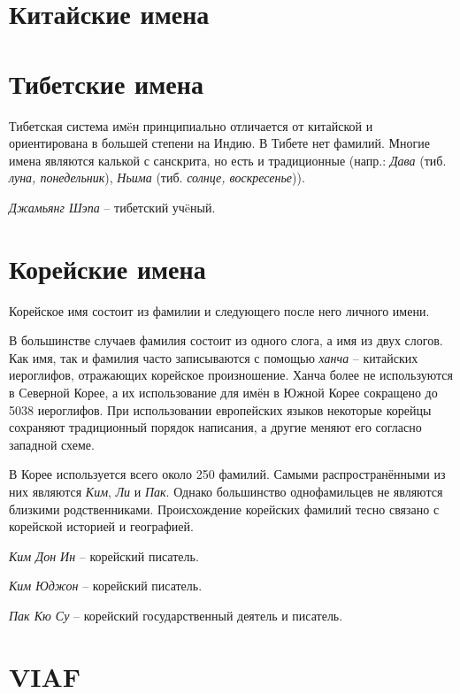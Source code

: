 \section{Китайские имена}

\section{Тибетские имена}

Тибетская система им\"eн принципиально отличается от китайской и ориентирована в большей степени на Индию. В Тибете нет фамилий. Многие имена являются калькой с санскрита, но есть и традиционные (напр.: \emph{Дава} (тиб. \emph{луна, понедельник}), \emph{Ньима} (тиб. \emph{солнце, воскресенье})).

\emph{Джамьянг Шэпа} -- тибетский уч\"eный.

\section{Корейские имена}

Корейское имя состоит из фамилии и следующего после него личного имени.

В большинстве случаев фамилия состоит из одного слога, а имя из двух слогов. Как имя, так и фамилия часто записываются с помощью \emph{ханча} -- китайских иероглифов, отражающих корейское произношение. Ханча более не используются в Северной Корее, а их использование для имён в Южной Корее сокращено до 5038 иероглифов. При использовании европейских языков некоторые корейцы сохраняют традиционный порядок написания, а другие меняют его согласно западной схеме.

В Корее используется всего около 250 фамилий. Самыми распространёнными из них являются \emph{Ким}, \emph{Ли} и \emph{Пак}. Однако большинство однофамильцев не являются близкими родственниками. Происхождение корейских фамилий тесно связано с корейской историей и географией.

\emph{Ким Дон Ин} -- корейский писатель.

\emph{Ким Юджон} -- корейский писатель.

\emph{Пак Кю Су} -- корейский государственный деятель и писатель.



\section{VIAF}

